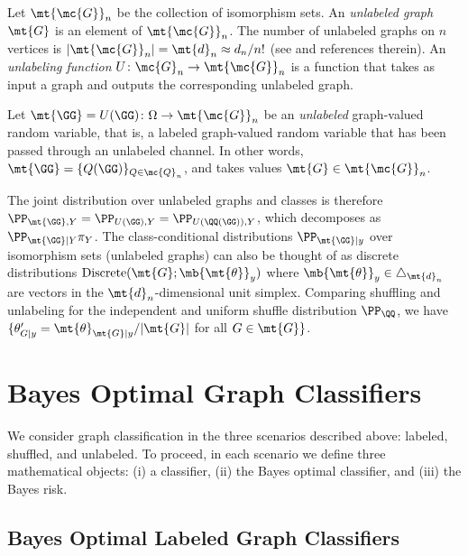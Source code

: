 \documentclass[10pt,journal,cspaper,compsoc]{IEEEtran}
\begin{document}

Let $\mt{\mc{G}}_n$ be the collection of isomorphism sets.
An \emph{unlabeled graph} $\mt{G}$ is an element of $\mt{\mc{G}}_n$. The number of unlabeled graphs on $n$ vertices is $|\mt{\mc{G}}_n|=\mt{d}_n \approx d_n/n!$ (see \cite{A000088} and references therein).
An \emph{unlabeling function} $U\colon \mc{G}_n \to \mt{\mc{G}}_n$ is a function that takes as input a graph and outputs the corresponding unlabeled graph. 
\begin{defi}
Let $\mt{\GG}=U(\GG)\colon \Omega \to \mt{\mc{G}}_n$ be an \emph{unlabeled} graph-valued random variable, that is, a labeled graph-valued random variable that has been passed through an unlabeled channel. In other words, $\mt{\GG}=\{Q(\GG)\}_{Q \in \mc{Q}_n}$, and takes values $\mt{G} \in \mt{\mc{G}}_n$. %
\end{defi}  
The joint distribution over unlabeled graphs and classes is therefore
$\PP_{\mt{\GG},Y}=\PP_{U(\GG),Y}=\PP_{U(\QQ(\GG)),Y}$, which decomposes as $\PP_{\mt{\GG}|Y} \pi_Y$. The class-conditional distributions $\PP_{\mt{\GG} | y}$ over isomorphism sets (unlabeled graphs) can also be thought of as discrete distributions $\text{Discrete}(\mt{G}; \mb{\mt{\theta}}_y)$ where $\mb{\mt{\theta}}_y\in \triangle_{\mt{d}_n}$ are vectors in the $\mt{d}_n$-dimensional unit simplex.   Comparing shuffling and unlabeling for the independent and uniform shuffle distribution $\PP_{\QQ}$, we have $\{\theta_{G|y}'=\mt{\theta}_{\mt{G}|y}/|\mt{G}|$ for all $G \in \mt{G}\}$.  




\section{Bayes Optimal Graph Classifiers} %
\label{sec:bayes_optimal_graph_classifiers}

We consider graph classification in the three scenarios described above: labeled, shuffled, and unlabeled.  To proceed, in each scenario we define three mathematical objects: (i) a classifier, (ii) the Bayes optimal classifier, and (iii) the Bayes risk.

\subsection{Bayes Optimal Labeled Graph Classifiers} %
\label{sub:labeled_graph_classifiers}
\end{document}
